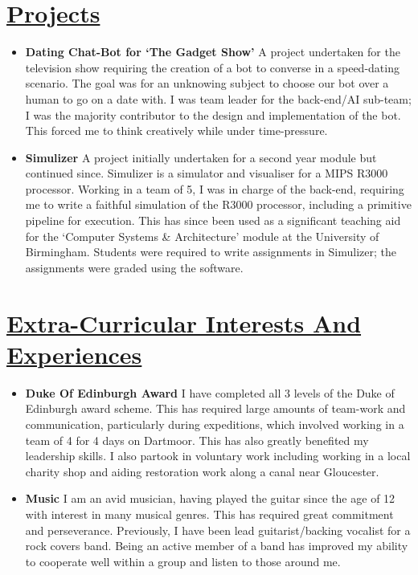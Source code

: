 \documentclass[11pt]{article}
\begin{document}
	\vspace{-20pt}
	\hspace{-100pt}\section*{\underline{Projects}} %
			\begin{itemize}
				\item \textbf{Dating Chat-Bot for `The Gadget Show'} A project undertaken for the television show requiring the creation of a bot to converse in a speed-dating scenario. The goal was for an unknowing subject to choose our bot over a human to go on a date with. I was team leader for the back-end/AI sub-team; I was the majority contributor to the design and implementation of the bot. This forced me to think creatively while under time-pressure.
				\item \textbf{Simulizer} A project initially undertaken for a second year module but continued since. Simulizer is a simulator and visualiser for a MIPS R3000 processor. Working in a team of 5, I was in charge of the back-end, requiring me to write a faithful simulation of the R3000 processor, including a primitive pipeline for execution. This has since been used as a significant teaching aid for the `Computer Systems \& Architecture' module at the University of Birmingham. Students were required to write assignments in Simulizer; the assignments were graded using the software.
			\end{itemize}

	\vspace{-20pt}
	\hspace{-100pt}\section*{\underline{Extra-Curricular Interests And Experiences}}
			\begin{itemize}
				\item \textbf{Duke Of Edinburgh Award} I have completed all 3 levels of the Duke of Edinburgh award scheme. This has required large amounts of team-work and communication, particularly during expeditions, which involved working in a team of 4 for 4 days on Dartmoor. This has also greatly benefited my leadership skills. I also partook in voluntary work including working in a local charity shop and aiding restoration work along a canal near Gloucester.
				\item \textbf{Music} I am an avid musician, having played the guitar since the age of 12 with interest in many musical genres. This has required great commitment and perseverance. Previously, I have been lead guitarist/backing vocalist for a rock covers band. Being an active member of a band has improved my ability to cooperate well within a group and listen to those around me. 
			\end{itemize}
\end{document}
